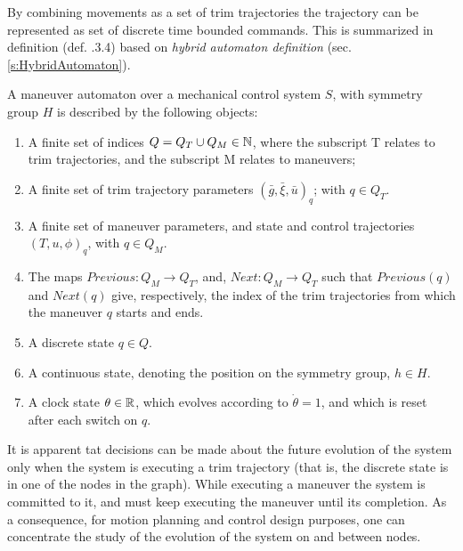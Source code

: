By combining movements as a set of trim trajectories the trajectory can be represented as set of discrete time bounded commands. This is summarized in definition (def. \cite{frazzoli2001robust}.3.4) based on \emph{hybrid automaton definition} (sec. \ref{s:HybridAutomaton}).
\begin{definition} A maneuver automaton over a mechanical control system $S$, with symmetry group $H$ is described by the following objects:

\begin{enumerate}
    \item A finite set of indices $Q = Q_T \cup Q_M \in \mathbb{N}$, where the subscript T relates to trim trajectories, and the subscript M relates to maneuvers;
    
    \item A finite set of trim trajectory parameters $\left(\bar{g},\bar{\xi},\bar{u}\right)_q$; with $q\in Q_T$.
    
    \item A finite set of maneuver parameters, and state and control trajectories $\left(T,u,\phi\right)_q$, with $q\in Q_M$.
    
    \item The maps $Previous: Q_M\to Q_T $, and, $Next: Q_M \to Q_T$ such that $Previous(q)$ and $Next(q)$ give, respectively, the index of the trim trajectories from which the maneuver $q$ starts and ends.
    
    \item A discrete state $q \in Q$.
    
    \item A continuous state, denoting the position on the symmetry group, $h \in H$.
    
    \item A clock state $\theta \in \mathbb{R}$, which evolves according to $\dot{\theta}=1$, and which is reset after each switch on $q$.
\end{enumerate}
\begin{note}
    It is apparent tat decisions can be made about the future evolution of the system only when the system is executing a trim trajectory (that is, the discrete state is in one of the nodes in the graph). While executing a maneuver the system is committed to it, and must keep executing the maneuver until its completion. As a consequence, for motion planning and control design purposes, one can concentrate the study of the evolution of the system on and between nodes.
\end{note}
\end{definition}


